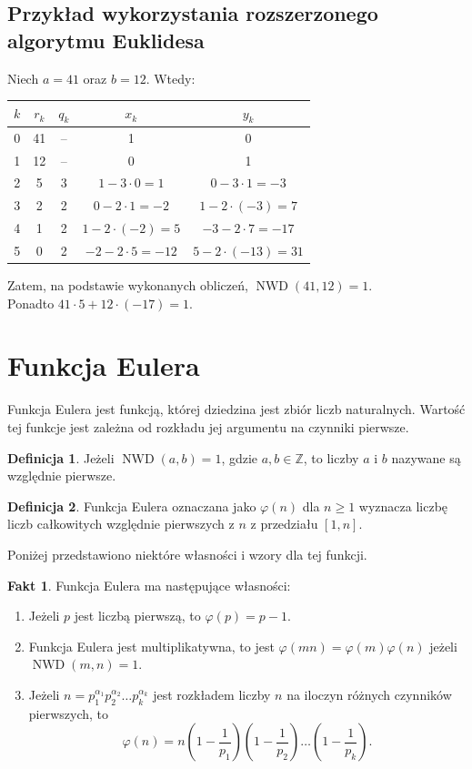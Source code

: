 \documentclass[12pt,twoside,a4]{mwbk}
\theoremstyle{definition}
\newtheorem{definicja}{Definicja}[chapter]
\newtheorem{fakt}{Fakt}[chapter]
\DeclareMathOperator{\NWD}{NWD}
\begin{document}
\subsection{Przykład wykorzystania rozszerzonego algorytmu Euklidesa}
Niech $a = 41$ oraz $b = 12$. Wtedy:
\begin{center} \begin{tabular}{|c|c|c|c|c|}
\hline
$k$ & $r_k$ & $q_k$ & $x_k$ & $y_k$ \\ \hline
0 & 41 & -- & 1 & 0 \\ \hline
1 & 12 & -- & 0 & 1 \\ \hline
2 & 5 & 3 & $1-3\cdot0 = 1$ & $0 -3 \cdot 1 = -3$ \\ \hline
3 & 2 & 2 & $0 - 2 \cdot 1 = -2$ & $1 - 2 \cdot (-3) = 7$ \\ \hline
4 & 1 & 2 & $1 - 2 \cdot (-2) = 5$ & $-3 - 2 \cdot 7 = -17$ \\ \hline
5 & 0 & 2 & $-2 - 2 \cdot 5 = -12$ & $5 - 2 \cdot (-13) = 31$ \\ \hline
\end{tabular} \end{center}
Zatem, na podstawie wykonanych obliczeń, $\NWD(41,12) = 1$. \\
Ponadto $41 \cdot 5 + 12 \cdot (-17) = 1$.


\section{Funkcja Eulera}
Funkcja Eulera jest funkcją, której dziedzina jest zbiór liczb naturalnych. Wartość tej funkcje jest zależna od rozkładu jej argumentu na czynniki pierwsze.

\begin{definicja}{\cite{handbook}}
	Jeżeli $\NWD(a,b)=1$, gdzie $a,b \in \mathbb{Z}$, to liczby $a$ i $b$ nazywane są względnie pierwsze.
\end{definicja}

\begin{definicja}{\cite{handbook}}
Funkcja Eulera oznaczana jako $\varphi(n)$ dla $n \geq 1$ wyznacza liczbę liczb całkowitych względnie pierwszych z $n$ z przedziału $[1,n]$.
\end{definicja}

Poniżej przedstawiono niektóre własności i wzory dla tej funkcji.
\begin{fakt}{\cite{handbook}}
Funkcja Eulera ma następujące własności:
\begin{enumerate}
\item Jeżeli $p$ jest liczbą pierwszą, to $\varphi(p) = p-1$.
\item Funkcja Eulera jest multiplikatywna, to jest $\varphi(mn) = \varphi(m) \varphi(n)$ jeżeli \\
$\NWD(m,n) = 1$.
\item Jeżeli $n = p_1^{\alpha_1} p_2^{\alpha_2} \ldots p_k^{\alpha_k}$ jest rozkładem liczby $n$ na iloczyn różnych czynników pierwszych, to
\[ \varphi(n) = n \left( 1 - \frac{1}{p_1} \right) \left( 1 - \frac{1}{p_2} \right) \ldots \left( 1 - \frac{1}{p_k} \right). \]
\end{enumerate}
\end{fakt}
\end{document}

